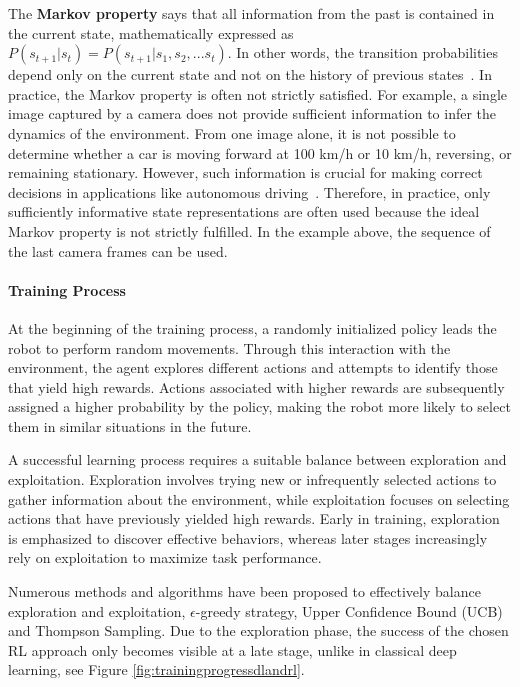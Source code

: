 The \textbf{Markov property} says that all information from the past is contained in the current state, mathematically expressed as $P(s_{t+1}|s_{t}) = P(s_{t+1}|s_{1},s_{2}, ... s_{t})$. In other words, the transition probabilities depend only on the current state and not on the history of previous states~\cite{jagtapUnderstandingMarkovDecision}.
In practice, the Markov property is often not strictly satisfied. For example, a single image captured by a camera does not provide sufficient information to infer the dynamics of the environment. From one image alone, it is not possible to determine whether a car is moving forward at 100 km/h or 10 km/h, reversing, or remaining stationary. However, such information is crucial for making correct decisions in applications like autonomous driving~\cite{staffWhatMarkovDecision2025}.
Therefore, in practice, only sufficiently informative state representations are often used because the ideal Markov property is not strictly fulfilled. In the example above, the sequence of the last camera frames can be used.



\paragraph{Training Process}
At the beginning of the training process, a randomly initialized policy leads the robot to perform random movements. Through this interaction with the environment, the agent explores different actions and attempts to identify those that yield high rewards. Actions associated with higher rewards are subsequently assigned a higher probability by the policy, making the robot more likely to select them in similar situations in the future.

A successful learning process requires a suitable balance between exploration and exploitation. 
Exploration involves trying new or infrequently selected actions to gather information about the environment, while exploitation focuses on selecting actions that have previously yielded high rewards. Early in training, exploration is emphasized to discover effective behaviors, whereas later stages increasingly rely on exploitation to maximize task performance.

Numerous methods and algorithms have been proposed to effectively balance exploration and exploitation, $\epsilon$-greedy strategy, Upper Confidence Bound (UCB) and Thompson Sampling. 
Due to the exploration phase, the success of the chosen \ac{RL} approach only becomes visible at a late stage, unlike in classical deep learning, see Figure \ref{fig:trainingprogressdlandrl}. 


